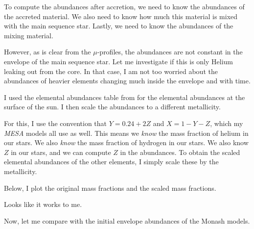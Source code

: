 \documentclass[a4paper,10pt]{article}
\begin{document}
To compute the abundances after accretion, we need to know the abundances of the accreted material. We also need to know how much this material is mixed with the 
main sequence star. Lastly, we need to know the abundances of the mixing material.

However, as is clear from the \(\mu \)-profiles, the abundances are not constant in the envelope of the main sequence star.
Let me investigate if this is only Helium leaking out from the core. In that case, I am not too worried about the abundances of
heavier elements changing much inside the envelope and with time.

\begin{figure}[ht]
    \centering
\end{figure}

I used the elemental abundances table from \citet{asplund2009} for the elemental abundances
at the surface of the sun. I then scale the abundances to a different metallicity.

For this, I use the convention that \(Y = 0.24 + 2Z\) and \(X = 1 - Y - Z\), which my \emph{MESA}
models all use as well.
This means we \emph{know} the mass fraction of helium in our stars.
We also \emph{know} the mass fraction of hydrogen in our stars.
We also know \(Z\) in our stars, and we can compute \(Z\) in the
\citet{asplund2009} abundances. To obtain the scaled elemental
abundances of the other elements, I simply scale these by
the metallicity.

Below, I plot the original mass fractions and the scaled mass fractions.

\begin{figure}[ht]
    \centering
\end{figure}

Looks like it works to me.

Now, let me compare with the initial envelope abundances of the Monash models.

\begin{figure}[ht]
    \centering
\end{figure}
\end{document}
